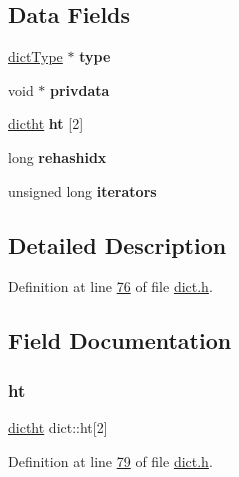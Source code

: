 \subsection*{Data Fields}
\begin{DoxyCompactItemize}
\item 
\mbox{\label{structdict_a89da3d5d54bd930937587a3c411af5fd}} 
\hyperlink{structdictType}{dict\+Type} $\ast$ {\bfseries type}
\item 
\mbox{\label{structdict_a36ce9f4e7d035fa4d7d2886f30b6a9af}} 
void $\ast$ {\bfseries privdata}
\item 
\mbox{\label{structdict_a5ed6a359a0f2da7f88c4cc352218445a}} 
\hyperlink{structdictht}{dictht} {\bfseries ht} \mbox{[}2\mbox{]}
\item 
\mbox{\label{structdict_aa6aeb098acd50b590319317ad8811b58}} 
long {\bfseries rehashidx}
\item 
\mbox{\label{structdict_a936aefce2677e310e5ecb5943558d614}} 
unsigned long {\bfseries iterators}
\end{DoxyCompactItemize}


\subsection{Detailed Description}


Definition at line \hyperlink{dict_8h_source_l00076}{76} of file \hyperlink{dict_8h_source}{dict.\+h}.



\subsection{Field Documentation}
\mbox{\label{structdict_a5ed6a359a0f2da7f88c4cc352218445a}} 
\subsubsection{\texorpdfstring{ht}{ht}}
{\footnotesize\ttfamily \hyperlink{structdictht}{dictht} dict\+::ht\mbox{[}2\mbox{]}}



Definition at line \hyperlink{dict_8h_source_l00079}{79} of file \hyperlink{dict_8h_source}{dict.\+h}.

